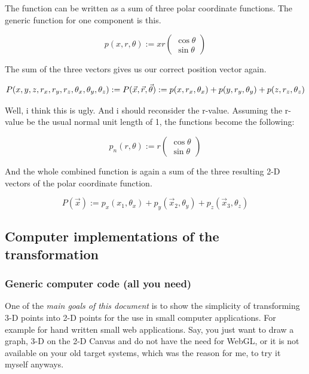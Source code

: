 \documentclass[a4paper]{article}
\begin{document}
\begin{Example}
The function can be written as a sum of three polar coordinate functions. The generic function for one component is this.

\begin{displaymath}
p(x, r, \theta) := xr\begin{pmatrix}\cos\theta\\\sin\theta\end{pmatrix}
\end{displaymath}

The sum of the three vectors gives us our correct position vector again.

\begin{displaymath}
P(x,y,z,r_x,r_y,r_z,\theta_x,\theta_y,\theta_z) :=  P(\vec{x}, \vec{r}, \vec{\theta}) := p(x, r_x, \theta_x)+p(y, r_y, \theta_y)+p(z, r_z, \theta_z)\\
\end{displaymath}

Well, i think this is ugly. And i should reconsider the r-value. Assuming the r-value be the usual normal unit length of 1, the functions become the following:

\begin{displaymath}
p_{n}(r, \theta) := r\begin{pmatrix}\cos\theta\\\sin\theta\end{pmatrix}
\end{displaymath}

And the whole combined function is again a sum of the three resulting 2-D vectors of the polar coordinate function.

\begin{displaymath}
P(\vec{x}) := p_{x}(x_{1}, \theta_{x}) + p_{y}(\vec{x}_{2}, \theta_{y}) + p_{z}(\vec{x}_{3}, \theta_{z})
\end{displaymath}



\subsection{Computer implementations of the transformation}
\subsubsection{Generic computer code (all you need)}

One of the \emph{main goals of this document} is to show the simplicity of transforming 3-D points into 2-D points for the use in small computer applications. For example for hand written small web applications. Say, you just want to draw a graph, 3-D on the 
2-D Canvas and do not have the need for WebGL, or it is not available on your old target systems, which was the reason for me, to try it myself anyways.\\


\end{Example}
\end{document}
